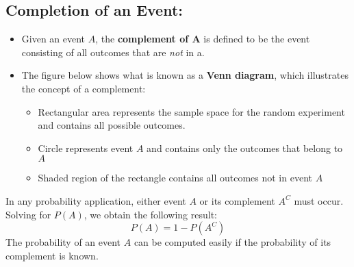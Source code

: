 \documentclass{report}
\begin{document}
\subsection{Completion of an Event:}
\begin{itemize}
  \item Given an event $A$, the \textbf{complement of A}  is defined to be the event consisting of all outcomes that are \textit{not} in a.
  \item The figure below shows what is known as a \textbf{Venn diagram}, which illustrates the concept of a complement:
    \begin{itemize}[label=$\circ$]
      \item Rectangular area represents the sample space for the random experiment and contains all possible outcomes. 
      \item Circle represents event $A$ and contains only the outcomes that belong to $A$
      \item Shaded region of the rectangle contains all outcomes not in event $A$
    \end{itemize}
    \bigbreak \noindent
\begin{figure}[ht]
    \centering
    \hspace{15mm}
\end{figure}
\end{itemize}
In any probability application, either event $A$ or its complement $A^C$ must occur.
\bigbreak \noindent
Solving for $P(A)$, we obtain the following result:
$$ P(A) = 1 - P(A^C)$$
The probability of an event $A$ can be computed easily if the probability of its complement is known.
\newpage
\end{document}
